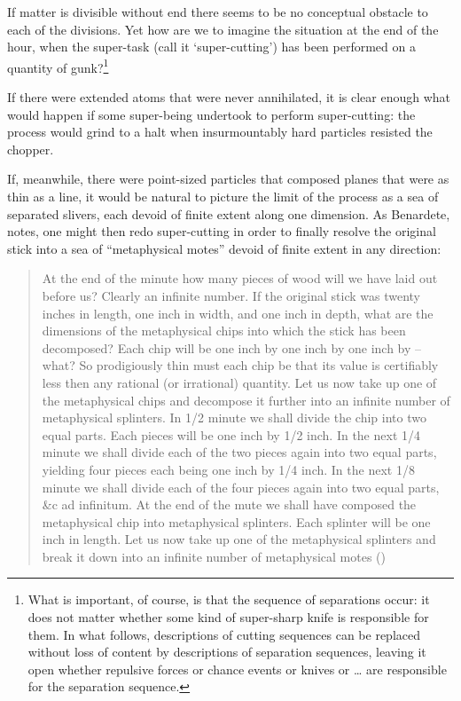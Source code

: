 \documentclass[
  10pt,
  letterpaper,
  DIV=11,
  numbers=noendperiod,
  twoside]{scrartcl}
\begin{document}
If matter is divisible without end there seems to be no conceptual
obstacle to each of the divisions. Yet how are we to imagine the
situation at the end of the hour, when the super-task (call it
`super-cutting') has been performed on a quantity of gunk?\footnote{What
  is important, of course, is that the sequence of separations occur: it
  does not matter whether some kind of super-sharp knife is responsible
  for them. In what follows, descriptions of cutting sequences can be
  replaced without loss of content by descriptions of separation
  sequences, leaving it open whether repulsive forces or chance events
  or knives or \ldots{} are responsible for the separation sequence.}

If there were extended atoms that were never annihilated, it is clear
enough what would happen if some super-being undertook to perform
super-cutting: the process would grind to a halt when insurmountably
hard particles resisted the chopper.

If, meanwhile, there were point-sized particles that composed planes
that were as thin as a line, it would be natural to picture the limit of
the process as a sea of separated slivers, each devoid of finite extent
along one dimension. As Benardete, notes, one might then redo
super-cutting in order to finally resolve the original stick into a sea
of ``metaphysical motes'' devoid of finite extent in any direction:

\begin{quote}
At the end of the minute how many pieces of wood will we have laid out
before us? Clearly an infinite number. If the original stick was twenty
inches in length, one inch in width, and one inch in depth, what are the
dimensions of the metaphysical chips into which the stick has been
decomposed? Each chip will be one inch by one inch by one inch by --
what? So prodigiously thin must each chip be that its value is
certifiably less then any rational (or irrational) quantity. Let us now
take up one of the metaphysical chips and decompose it further into an
infinite number of metaphysical splinters. In 1/2 minute we shall divide
the chip into two equal parts. Each pieces will be one inch by 1/2 inch.
In the next 1/4 minute we shall divide each of the two pieces again into
two equal parts, yielding four pieces each being one inch by 1/4 inch.
In the next 1/8 minute we shall divide each of the four pieces again
into two equal parts, \&c ad infinitum. At the end of the mute we shall
have composed the metaphysical chip into metaphysical splinters. Each
splinter will be one inch in length. Let us now take up one of the
metaphysical splinters and break it down into an infinite number of
metaphysical motes ()
\end{quote}
\end{document}
